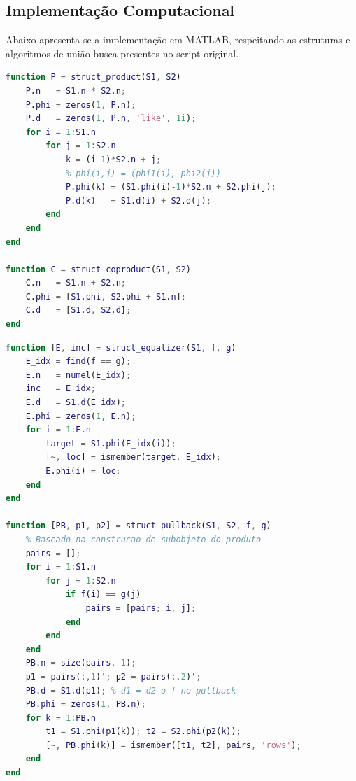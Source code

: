 \subsection{Implementação Computacional}

Abaixo apresenta-se a implementação em MATLAB, respeitando as estruturas e algoritmos de união-busca presentes no script original.

\begin{lstlisting}[language=Matlab, caption={Produto e Coproduto em Struct}]
function P = struct_product(S1, S2)
    P.n   = S1.n * S2.n;
    P.phi = zeros(1, P.n);
    P.d   = zeros(1, P.n, 'like', 1i);
    for i = 1:S1.n
        for j = 1:S2.n
            k = (i-1)*S2.n + j;
            % phi(i,j) = (phi1(i), phi2(j))
            P.phi(k) = (S1.phi(i)-1)*S2.n + S2.phi(j);
            P.d(k)   = S1.d(i) + S2.d(j); 
        end
    end
end

function C = struct_coproduct(S1, S2)
    C.n   = S1.n + S2.n;
    C.phi = [S1.phi, S2.phi + S1.n];
    C.d   = [S1.d, S2.d];
end
\end{lstlisting}

\begin{lstlisting}[language=Matlab, caption={Equalizador e Pullback em Struct}]
function [E, inc] = struct_equalizer(S1, f, g)
    E_idx = find(f == g);
    E.n   = numel(E_idx);
    inc   = E_idx;
    E.d   = S1.d(E_idx);
    E.phi = zeros(1, E.n);
    for i = 1:E.n
        target = S1.phi(E_idx(i));
        [~, loc] = ismember(target, E_idx);
        E.phi(i) = loc;
    end
end

function [PB, p1, p2] = struct_pullback(S1, S2, f, g)
    % Baseado na construcao de subobjeto do produto
    pairs = [];
    for i = 1:S1.n
        for j = 1:S2.n
            if f(i) == g(j)
                pairs = [pairs; i, j];
            end
        end
    end
    PB.n = size(pairs, 1);
    p1 = pairs(:,1)'; p2 = pairs(:,2)';
    PB.d = S1.d(p1); % d1 = d2 o f no pullback
    PB.phi = zeros(1, PB.n);
    for k = 1:PB.n
        t1 = S1.phi(p1(k)); t2 = S2.phi(p2(k));
        [~, PB.phi(k)] = ismember([t1, t2], pairs, 'rows');
    end
end
\end{lstlisting}

